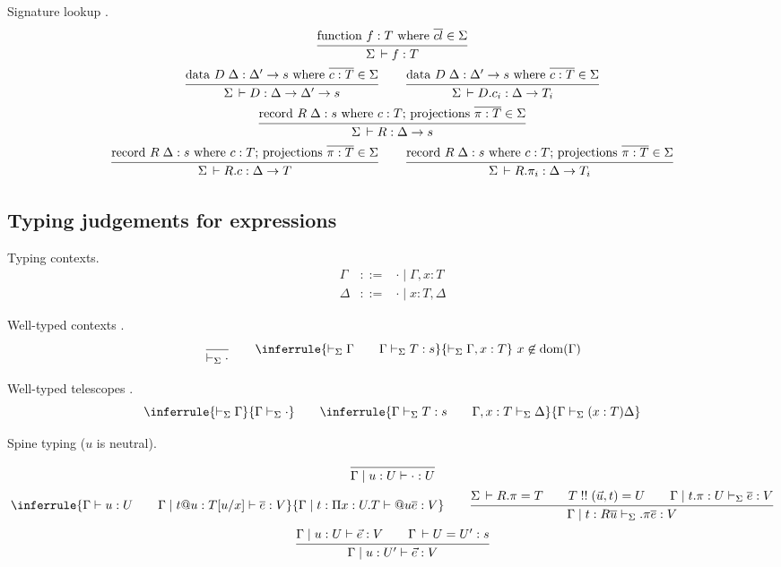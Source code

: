 \documentclass[acmlarge,fleqn]{acmart}\settopmatter{}
\begin{document}
Signature lookup .
\begin{gather*}
  \ru{\funsig \in \Sigma
    }{\Sigma \der f : T}
\\
  \ru{\datasig \in \Sigma
    }{\Sigma \der D : \Delta \to \Delta' \to s}
\qquad
  \ru{\datasig \in \Sigma
    }{\Sigma \der D.c_i : \Delta \to T_i}
\\
  \ru{\recsig \in \Sigma
    }{\Sigma \der R : \Delta \to s}
\\
  \ru{\recsig \in \Sigma
    }{\Sigma \der R.c : \Delta \to T}
\qquad
  \ru{\recsig \in \Sigma
    }{\Sigma \der R.\pi_i : \Delta \to T_i}
\end{gather*}




\subsection{Typing judgements for expressions}


Typing contexts.
\[
\begin{array}{lcl}
\Gamma & ::= & \cdot \mid \Gamma, x:T \\
\Delta & ::= & \cdot \mid x:T, \Delta
\end{array}
\]

Well-typed contexts \fbox{$\vdash_\Sigma \Gamma$}.
\[
\ru{}{\vdash_\Sigma \cdot}
\qquad
\inferrule
  {\vdash_\Sigma \Gamma \qquad \Gamma \vdash_\Sigma T:s}
  {\vdash_\Sigma \Gamma, x : T} \ x \not\in \dom(\Gamma)
\]

Well-typed telescopes \fbox{$\Gamma \vdash_\Sigma \Delta$}.
\[
\inferrule
  {\vdash_\Sigma \Gamma}
  {\Gamma \vdash_\Sigma \cdot}
\qquad
\inferrule{\Gamma \vdash_\Sigma T : s \qquad \Gamma, x:T \vdash_\Sigma \Delta}
{\Gamma \vdash_\Sigma (x:T) \Delta}
\]

Spine typing 
($u$ is neutral).
\begin{gather*}
\ru{}
{\Gamma \mid u:U \vdash \cdot : U}
\\
\inferrule
  {\Gamma \vdash u:U \qquad \Gamma \mid t@u:T[u/x] \vdash \overline{e} : V}
  {\Gamma \mid t : \Pi x:U.T \vdash @u \overline{e}:V}
\qquad
\ru{\Sigma \der R.\pi = T \qquad
    T \twobang (\vec u,t) = U \qquad
    \Gamma \mid t.\pi : U \vdash_\Sigma \overline{e} : V
  }{\Gamma \mid t :  R\overline{u}  \vdash_\Sigma .\pi \overline{e} : V}
\\
\ru{\Gamma \mid u : U \vdash \vec e : V \qquad
    \Gamma \der U = U' : s
  }{\Gamma \mid u : U' \vdash \vec e : V}
\end{gather*}
\end{document}
